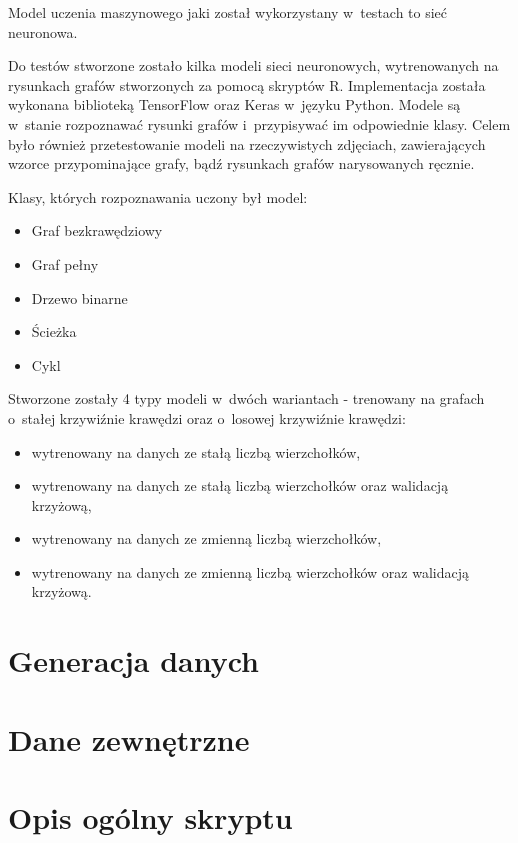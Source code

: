 Model uczenia maszynowego jaki został wykorzystany w~testach to sieć neuronowa.

Do testów stworzone zostało kilka modeli sieci neuronowych,
wytrenowanych na rysunkach grafów stworzonych za pomocą skryptów R.
Implementacja została wykonana biblioteką TensorFlow oraz Keras w~języku Python.
Modele są w~stanie rozpoznawać rysunki grafów i~przypisywać im odpowiednie klasy.
Celem było również przetestowanie modeli na rzeczywistych zdjęciach,
zawierających wzorce przypominające grafy, bądź rysunkach grafów narysowanych ręcznie.

Klasy, których rozpoznawania uczony był model:
\begin{itemize}[label=-,labelsep=0.4cm,leftmargin=0.6cm]
	\item Graf bezkrawędziowy
	\item Graf pełny
	\item Drzewo binarne
	\item Ścieżka
	\item Cykl
\end{itemize}

Stworzone zostały 4 typy modeli w~dwóch wariantach - trenowany na grafach o~stałej krzywiźnie krawędzi oraz o~losowej krzywiźnie krawędzi:
\begin{itemize}[label=-,labelsep=0.4cm,leftmargin=0.6cm]
	\item wytrenowany na danych ze stałą liczbą wierzchołków,
	\item wytrenowany na danych ze stałą liczbą wierzchołków oraz walidacją krzyżową,
	\item wytrenowany na danych ze zmienną liczbą wierzchołków,
	\item wytrenowany na danych ze zmienną liczbą wierzchołków oraz walidacją krzyżową.
\end{itemize}

\section{Generacja danych}


\section{Dane zewnętrzne}


\section{Opis ogólny skryptu}
